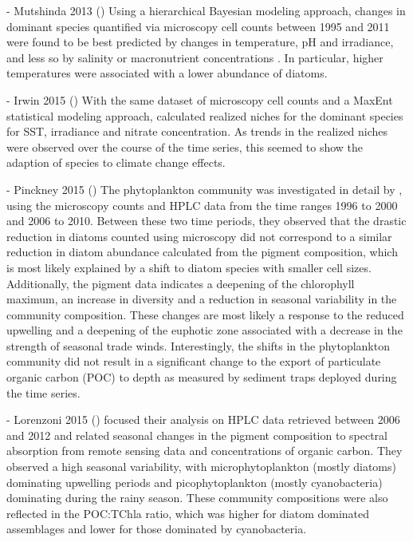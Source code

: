 \documentclass[draft]{agujournal2019}
\begin{document}
    - Mutshinda 2013 ()
    Using a hierarchical Bayesian modeling approach, changes in dominant species quantified via microscopy cell counts between 1995 and 2011 were found to be best predicted by changes in temperature, pH and irradiance, and less so by salinity or macronutrient concentrations \cite{mutshinda_environmental_2013}. In particular, higher temperatures were associated with a lower abundance of diatoms. 
    
    - Irwin 2015 ()
    With the same dataset of microscopy cell counts and a MaxEnt statistical modeling approach,  calculated realized niches for the dominant species for SST, irradiance and nitrate concentration. As trends in the realized niches were observed over the course of the time series, this seemed to show the adaption of species to climate change effects. 
    
    - Pinckney 2015 ()
    The phytoplankton community was investigated in detail by , using the microscopy counts and HPLC data from the time ranges 1996 to 2000 and 2006 to 2010. Between these two time periods, they observed that the drastic reduction in diatoms counted using microscopy did not correspond to a similar reduction in diatom abundance calculated from the pigment composition, which is most likely explained by a shift to diatom species with smaller cell sizes. Additionally, the pigment data indicates a deepening of the chlorophyll maximum, an increase in diversity and a reduction in seasonal variability in the community composition. These changes are most likely a response to the reduced upwelling  and a deepening of the euphotic zone associated with a decrease in the strength of seasonal trade winds. Interestingly, the shifts in the phytoplankton community did not result in a significant change to the export of particulate organic carbon (POC) to depth as measured by sediment traps deployed during the time series. 

    - Lorenzoni 2015 ()
     focused their analysis on HPLC data retrieved between 2006 and 2012 and related seasonal changes in the pigment composition to spectral absorption from remote sensing data and concentrations of organic carbon. They observed a high seasonal variability, with microphytoplankton (mostly diatoms) dominating upwelling periods and picophytoplankton (mostly cyanobacteria) dominating during the rainy season. These community compositions were also reflected in the POC:TChla ratio, which was higher for diatom dominated assemblages and lower for those dominated by cyanobacteria. 
    
\end{document}
